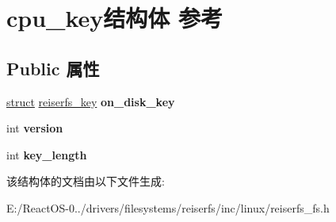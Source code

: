 \hypertarget{structcpu__key}{}\section{cpu\+\_\+key结构体 参考}
\label{structcpu__key}
\subsection*{Public 属性}
\begin{DoxyCompactItemize}
\item 
\mbox{\label{structcpu__key_af4826ee019794f3a7f0caa133a6de2a3}} 
\hyperlink{interfacestruct}{struct} \hyperlink{structreiserfs__key}{reiserfs\+\_\+key} {\bfseries on\+\_\+disk\+\_\+key}
\item 
\mbox{\label{structcpu__key_a9cd532834a43c0309eb927b8e35e69bf}} 
int {\bfseries version}
\item 
\mbox{\label{structcpu__key_a124063a384c03a344752aa0371d0c222}} 
int {\bfseries key\+\_\+length}
\end{DoxyCompactItemize}


该结构体的文档由以下文件生成\+:\begin{DoxyCompactItemize}
\item 
E\+:/\+React\+O\+S-\/0../drivers/filesystems/reiserfs/inc/linux/reiserfs\+\_\+fs.\+h\end{DoxyCompactItemize}
